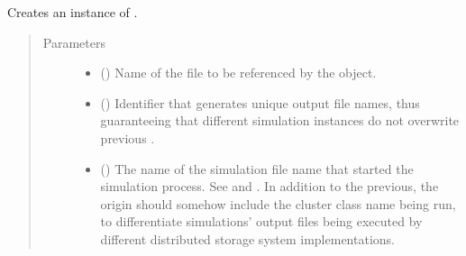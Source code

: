 \documentclass[letterpaper,10pt,english]{sphinxmanual}
\begin{document}
\begin{fulllineitems}

\begin{fulllineitems}
\label{\detokenize{app.domain.helpers:app.domain.helpers.smart_dataclasses.FileData.__init__}}
Creates an instance of .
\begin{quote}\begin{description}
\item[{Parameters}] \leavevmode\begin{itemize}
\item {} 
 () \textendash{} Name of the file to be referenced by the  object.

\item {} 
 () \textendash{} Identifier that generates unique output file names,
thus guaranteeing that different simulation instances do not
overwrite previous {\hyperref[\detokenize{app.domain.helpers:app.domain.helpers.smart_dataclasses.FileData.out_file}]{}}.

\item {} 
 () \textendash{} The name of the simulation file name that started
the simulation process. See
{\hyperref[\detokenize{app.domain:app.domain.master_servers.Master}]{}} and
{\hyperref[\detokenize{app:module-app.hive_simulation}]{}}. In addition to the previous,
the origin should somehow include the cluster class name
being run, to differentiate simulations’ output files being
executed by different distributed storage system
implementations.


\end{itemize}
\end{description}
\end{quote}
\end{fulllineitems}
\end{fulllineitems}
\end{document}
